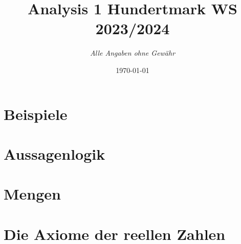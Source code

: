 \documentclass{report}
\title{Analysis 1 Hundertmark WS 2023/2024} %
\author{\textit{Alle Angaben ohne Gewähr}}
\date{\today} %
\begin{document}
\maketitle

\newpage


\chapter{Beispiele}

 \chapter{Aussagenlogik}%
 

 \chapter{Mengen}%
 
 

\chapter{Die Axiome der reellen Zahlen}

 
\end{document}
